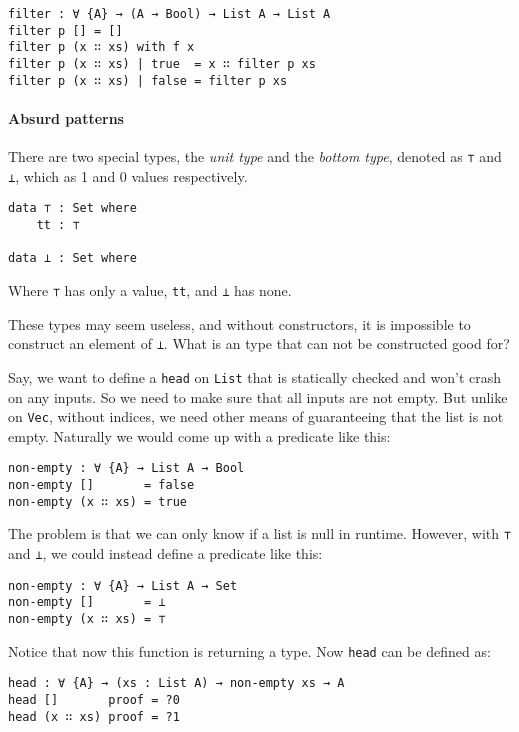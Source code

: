\documentclass[14pt, a4paper]{article}
\begin{document}
\begin{lstlisting}
filter : ∀ {A} → (A → Bool) → List A → List A
filter p [] = []
filter p (x ∷ xs) with f x
filter p (x ∷ xs) | true  = x ∷ filter p xs
filter p (x ∷ xs) | false = filter p xs
\end{lstlisting}

\paragraph{Absurd patterns}

There are two special types, the \textit{unit type} and the \textit{bottom type},
denoted as {\lstinline|⊤|} and {\lstinline|⊥|}, which as 1 and 0 values respectively.

\begin{lstlisting}
data ⊤ : Set where
    tt : ⊤

data ⊥ : Set where
\end{lstlisting}

Where {\lstinline|⊤|} has only a value, {\lstinline|tt|}, and {\lstinline|⊥|} has none.

These types may seem useless, and without constructors, it is impossible to
construct an element of {\lstinline|⊥|}. What is an type that can not be
constructed good for?

Say, we want to define a {\lstinline|head|} on {\lstinline|List|} that is
statically checked and won't crash on any inputs. So we need to make sure that
all inputs are not empty. But unlike on {\lstinline|Vec|}, without indices, we
need other means of guaranteeing that the list is not empty. Naturally we would
come up with a predicate like this:

\begin{lstlisting}
non-empty : ∀ {A} → List A → Bool
non-empty []       = false
non-empty (x ∷ xs) = true
\end{lstlisting}

The problem is that we can only know if a list is null in runtime. However, with
 {\lstinline|⊤|} and {\lstinline|⊥|}, we could instead define a predicate like this:

\begin{lstlisting}
non-empty : ∀ {A} → List A → Set
non-empty []       = ⊥
non-empty (x ∷ xs) = ⊤
\end{lstlisting}

Notice that now this function is returning a type. Now {\lstinline|head|} can be
defined as:

\begin{lstlisting}
head : ∀ {A} → (xs : List A) → non-empty xs → A
head []       proof = ?0
head (x ∷ xs) proof = ?1
\end{lstlisting}
\end{document}
